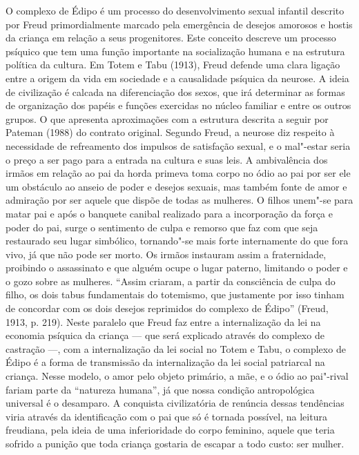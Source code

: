 O complexo de Édipo é um processo do desenvolvimento sexual infantil
descrito por Freud primordialmente marcado pela emergência de desejos
amorosos e hostis da criança em relação a seus progenitores. Este
conceito descreve um processo psíquico que tem uma função importante na
socialização humana e na estrutura política da cultura. Em Totem e Tabu
(1913), Freud defende uma clara ligação entre a origem da vida em
sociedade e a causalidade psíquica da neurose. A ideia de civilização é
calcada na diferenciação dos sexos, que irá determinar as formas de
organização dos papéis e funções exercidas no núcleo familiar e entre os
outros grupos. O que apresenta aproximações com a estrutura descrita a
seguir por Pateman (1988) do contrato original. Segundo Freud, a neurose
diz respeito à necessidade de refreamento dos impulsos de satisfação
sexual, e o mal"-estar seria o preço a ser pago para a entrada na cultura
e suas leis. A ambivalência dos irmãos em relação ao pai da horda
primeva toma corpo no ódio ao pai por ser ele um obstáculo ao anseio de
poder e desejos sexuais, mas também fonte de amor e admiração por ser
aquele que dispõe de todas as mulheres. O filhos unem"-se para matar pai
e após o banquete canibal realizado para a incorporação da força e poder
do pai, surge o sentimento de culpa e remorso que faz com que seja
restaurado seu lugar simbólico, tornando"-se mais forte internamente do
que fora vivo, já que não pode ser morto. Os irmãos instauram assim a
fraternidade, proibindo o assassinato e que alguém ocupe o lugar
paterno, limitando o poder e o gozo sobre as mulheres. ``Assim criaram,
a partir da consciência de culpa do filho, os dois tabus fundamentais do
totemismo, que justamente por isso tinham de concordar com os dois
desejos reprimidos do complexo de Édipo'' (Freud, 1913, p. 219). Neste
paralelo que Freud faz entre a internalização da lei na economia
psíquica da criança --- que será explicado através do complexo de
castração ---, com a internalização da lei social no Totem e Tabu, o
complexo de Édipo é a forma de transmissão da internalização da lei
social patriarcal na criança. Nesse modelo, o amor pelo objeto primário,
a mãe, e o ódio ao pai"-rival fariam parte da ``natureza humana'', já que
nossa condição antropológica universal é o desamparo. A conquista
civilizatória de renúncia dessas tendências viria através da
identificação com o pai que só é tornada possível, na leitura freudiana,
pela ideia de uma inferioridade do corpo feminino, aquele que teria
sofrido a punição que toda criança gostaria de escapar a todo custo: ser
mulher.

